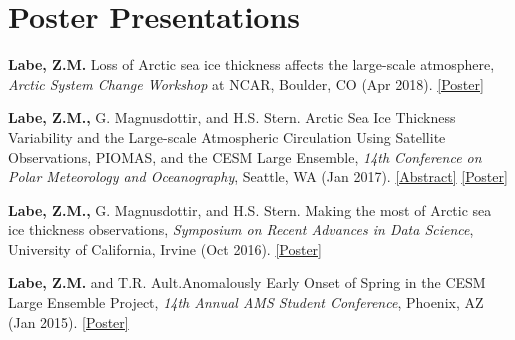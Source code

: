 \documentclass[margin,line,palatino,courier,10pt]{res}
\begin{document}
\begin{resume}
\begin{etaremune}[leftmargin=0in,topsep=0in,parsep=0in]
\end{etaremune}

\section{\sc \textcolor{Cerulean}{\large{\textbf{Poster Presentations}}}}
\begin{etaremune}[leftmargin=0in,topsep=0in,parsep=0in]
\item \textbf{Labe, Z.M.} Loss of Arctic sea ice thickness affects the large-scale atmosphere, \textit{Arctic System Change Workshop} at NCAR, Boulder, CO (Apr 2018). \href{https://sites.uci.edu/zlabe/files/2019/09/ZLabe_042018_BigIdeaPoster.pdf}{[Poster]}
\item \textbf{Labe, Z.M.,} G. Magnusdottir, and H.S. Stern. Arctic Sea Ice Thickness Variability and the Large-scale Atmospheric Circulation Using Satellite Observations, PIOMAS, and the CESM Large Ensemble, \textit{14th Conference on Polar Meteorology and Oceanography}, Seattle, WA (Jan 2017). \href{https://ams.confex.com/ams/97Annual/webprogram/Paper313445.html}{[Abstract]} \href{http://sites.uci.edu/zlabe/files/2017/01/ZLabeMagnusdottirStern_AMSposter_2017.pdf}{[Poster]}
\item \textbf{Labe, Z.M.,} G. Magnusdottir, and H.S. Stern. Making the most of Arctic sea ice thickness observations, \textit{Symposium on Recent Advances in Data Science}, University of California, Irvine (Oct 2016). \href{http://sites.uci.edu/zlabe/files/2016/10/ZLabeMagnusdottirStern_DSIposter_Oct16.pdf}{[Poster]}
\item \textbf{Labe, Z.M.} and T.R. Ault.\@ Anomalously Early Onset of Spring in the CESM Large Ensemble Project, \textit{14th Annual AMS Student Conference}, Phoenix, AZ (Jan 2015). \href{https://ams.confex.com/ams/95Annual/webprogram/Paper271063.html}{[Poster]}

\end{etaremune}


\end{resume}
\end{document}
